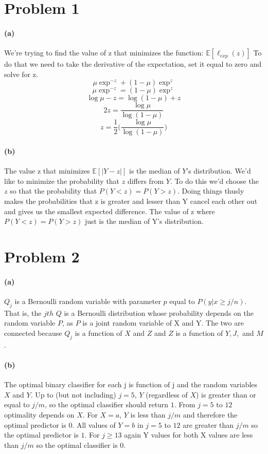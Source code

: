 \documentclass[twoside,11pt]{homework}
\begin{document}
\maketitle

\section*{Problem 1}
\paragraph{(a)} We're trying to find the value of z that minimizes the function: $ \mathbb{E}[\ell_{exp}(z)] $ To do that we need to take the derivative of the expectation, set it equal to zero and solve for z.  
$$\mu\exp^{-z} + (1 - \mu)\exp^z $$
$$ \mu\exp^{-z} = (1 - \mu)\exp^z $$
$$ \log\mu - z = \log(1 - \mu) + z $$
$$ 2z = \frac{\log\mu}{\log(1 - \mu)} $$
$$ z = \frac{1}{2} \bigg(\frac{\log\mu}{\log(1 - \mu)}\bigg) $$


\paragraph{(b)} The value z that minimizes $ \mathbb{E}[|Y-z|] $ is the median of $Y$'s distribution.  We'd like to minimize the probability that $z$ differs from $Y$.  To do this we'd choose the $z$ so that the probability that $P(Y<z) = P(Y>z)$.  Doing things thusly makes the probabilities that z is greater and lesser than Y cancel each other out and gives us the smallest expected difference.  The value of z where $P(Y<z) = P(Y>z)$ just is the median of Y's distribution.

\section*{Problem 2}

\paragraph{(a)} $Q_j$ is a Bernoulli random variable with parameter $p$ equal to $P(y|x \geq j/n)$.  That is, the $jth$ $Q$ is a Bernoulli distribution whose probability depends on the random variable $P$, as $P$ is a joint random variable of X and Y.  The two are connected because $Q_j$ is a function of $X$ and $Z$ and $Z$ is a function of $Y, J,$ and $M$.

\paragraph{(b)} The optimal binary classifier for each j is function of j and the random variables $X$ and $Y$. Up to (but not including) $j=5$, $Y$ (regardless of $X$) is greater than or equal to $j/m$, so the optimal classifier should return $1$.  From $j=5$ to $12$ optimality depends on $X$.  For $X = a$, $Y$ is less than $j/m$ and therefore the optimal predictor is 0.  All values of $Y = b$ in $j=5$ to $12$ are greater than $j/m$ so the optimal predictor is $1$. For $j \geq 13$ again Y values for both X values are less than $j/m$ so the optimal classifier is 0.\\
\end{document}
